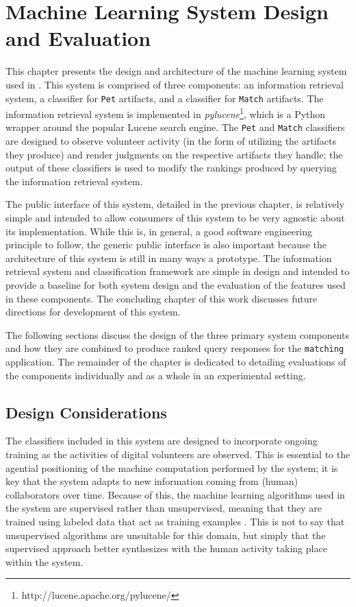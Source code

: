 \chapter{Machine Learning System Design and Evaluation}
\label{ml}

This chapter presents the design and architecture of the machine learning system used in \nplh.  This system is comprised of three components: an information retrieval system, a classifier for {\tt Pet} artifacts, and a classifier for {\tt Match} artifacts.  The information retrieval system is implemented in {\em pylucene}\footnote{http://lucene.apache.org/pylucene/}, which is a Python wrapper around the popular Lucene search engine.  The {\tt Pet} and {\tt Match} classifiers are designed to observe volunteer activity (in the form of utilizing the artifacts they produce) and render judgments on the respective artifacts they handle; the output of these classifiers is used to modify the rankings produced by querying the information retrieval system.

The public interface of this system, detailed in the previous chapter, is relatively simple and intended to allow consumers of this system to be very agnostic about its implementation.  While this is, in general, a good software engineering principle to follow, the generic public interface is also important because the architecture of this system is still in many ways a prototype.  The information retrieval system and classification framework are simple in design and intended to provide a baseline for both system design and the evaluation of the features used in these components.  The concluding chapter of this work discusses future directions for development of this system.

The following sections discuss the design of the three primary system components and how they are combined to produce ranked query responses for the {\tt matching} application.  The remainder of the chapter is dedicated to detailing evaluations of the components individually and as a whole in an experimental setting.

\section {Design Considerations}

The classifiers included in this system are designed to incorporate ongoing training as the activities of digital volunteers are observed.  This is essential to the agential positioning of the machine computation performed by the system; it is key that the system adapts to new information coming from (human) collaborators over time.  Because of this, the machine learning algorithms used in the system are supervised rather than unsupervised, meaning that they are trained using labeled data that act as training examples \cite{jurafsky:nlp}.  This is not to say that unsupervised algorithms are unsuitable for this domain, but simply that the supervised approach better synthesizes with the human activity taking place within the system.


